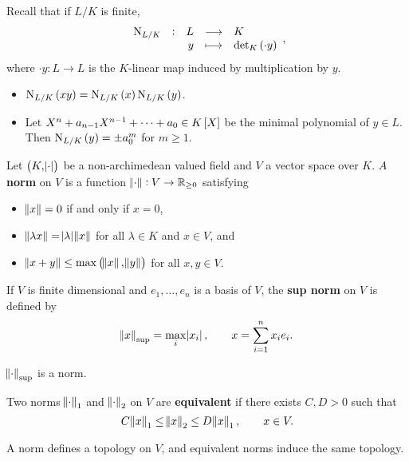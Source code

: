 Recall that if $ L / K $ is finite,
$$ \function[\N_{L / K}]{L}{K}{y}{\det_K \br{\cdot y}}, $$
where $ \cdot y : L \to L $ is the $ K $-linear map induced by multiplication by $ y $.

\begin{fact*}
\hfill
\begin{itemize}
\item $ \N_{L / K}\br{xy} = \N_{L / K}\br{x}\N_{L / K}\br{y} $.
\item Let $ X^n + a_{n - 1}X^{n - 1} + \dots + a_0 \in K\sbr{X} $ be the minimal polynomial of $ y \in L $. Then $ \N_{L / K}\br{y} = \pm a_0^m $ for $ m \ge 1 $.
\end{itemize}
\end{fact*}

\pagebreak

\begin{definition}
Let $ \br{K, \abs{\cdot}} $ be a non-archimedean valued field and $ V $ a vector space over $ K $. $ A $ \textbf{norm} on $ V $ is a function $ \norm{\cdot} : V \to \mathbb{R}_{\ge 0} $ satisfying
\begin{itemize}
\item $ \norm{x} = 0 $ if and only if $ x = 0 $,
\item $ \norm{\lambda x} = \abs{\lambda}\norm{x} $ for all $ \lambda \in K $ and $ x \in V $, and
\item $ \norm{x + y} \le \max\br{\norm{x}, \norm{y}} $ for all $ x, y \in V $.
\end{itemize}
\end{definition}

\begin{example*}
If $ V $ is finite dimensional and $ e_1, \dots, e_n $ is a basis of $ V $, the \textbf{sup norm} on $ V $ is defined by
$$ \norm{x}_{\sup} = \max_i \abs{x_i}, \qquad x = \sum_{i = 1}^n x_ie_i. $$
\end{example*}

\begin{exercise*}
$ \norm{\cdot}_{\sup} $ is a norm.
\end{exercise*}

\begin{definition}
Two norms $ \norm{\cdot}_1 $ and $ \norm{\cdot}_2 $ on $ V $ are \textbf{equivalent} if there exists $ C, D > 0 $ such that
$$ C\norm{x}_1 \le \norm{x}_2 \le D\norm{x}_1, \qquad x \in V. $$
\end{definition}

\begin{fact*}
A norm defines a topology on $ V $, and equivalent norms induce the same topology.
\end{fact*}

